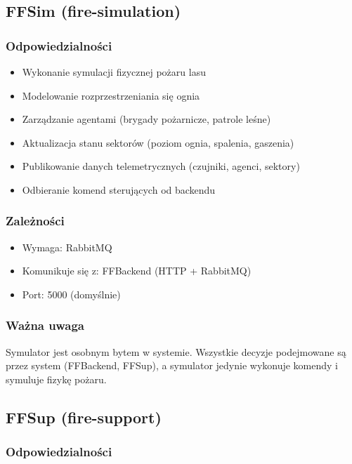 \documentclass[11pt,a4paper]{article}
\begin{document}
\subsection{FFSim (fire-simulation)}

\subsubsection{Odpowiedzialności}

\begin{itemize}
    \item Wykonanie symulacji fizycznej pożaru lasu
    \item Modelowanie rozprzestrzeniania się ognia
    \item Zarządzanie agentami (brygady pożarnicze, patrole leśne)
    \item Aktualizacja stanu sektorów (poziom ognia, spalenia, gaszenia)
    \item Publikowanie danych telemetrycznych (czujniki, agenci, sektory)
    \item Odbieranie komend sterujących od backendu
\end{itemize}


\subsubsection{Zależności}

\begin{itemize}
    \item Wymaga: RabbitMQ
    \item Komunikuje się z: FFBackend (HTTP + RabbitMQ)
    \item Port: 5000 (domyślnie)
\end{itemize}

\subsubsection{Ważna uwaga}

Symulator jest osobnym bytem w systemie. Wszystkie decyzje podejmowane są przez system (FFBackend, FFSup), a symulator jedynie wykonuje komendy i symuluje fizykę pożaru.

\subsection{FFSup (fire-support)}

\subsubsection{Odpowiedzialności}
\end{document}
